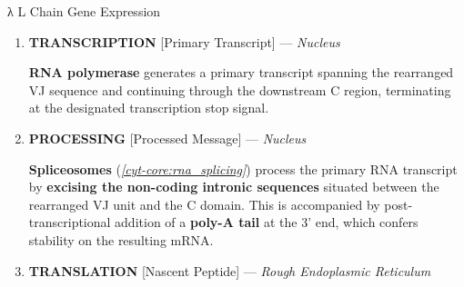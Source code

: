 \begin{core}[label=core:ll_chain_gene_expression]{λ L Chain Gene Expression}
\begin{enumerate}[label=(\arabic*)]
          \item \textbf{TRANSCRIPTION} [Primary Transcript] --- \textit{Nucleus}


            \textbf{RNA polymerase} generates a primary transcript spanning the rearranged VJ sequence and continuing through the downstream C region, terminating at the designated transcription stop signal.

          \item \textbf{PROCESSING} [Processed Message] --- \textit{Nucleus}


            \textbf{Spliceosomes} (\textit{\autoref{cyt-core:rna_splicing}}) process the primary RNA transcript by \textbf{excising the non-coding intronic sequences} situated between the rearranged VJ unit and the C domain. This is accompanied by post-transcriptional addition of a \textbf{poly-A tail} at the 3' end, which confers stability on the resulting mRNA.

          \item \textbf{TRANSLATION} [Nascent Peptide] --- \textit{Rough Endoplasmic Reticulum}

\end{enumerate}
\end{core}
